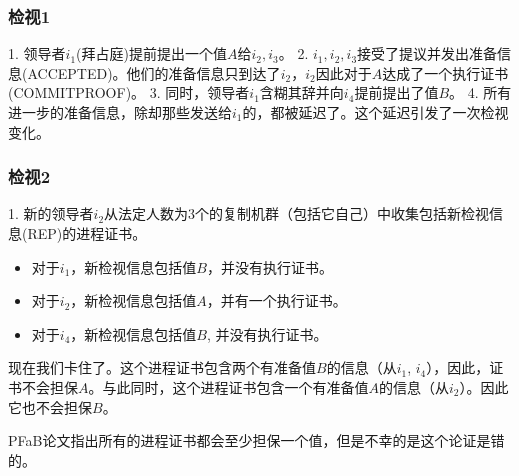 \documentclass[UTF8]{ctexart}
\begin{document}
\subsubsection*{检视1}
1. 领导者$i_1$(拜占庭)提前提出一个值$A$给$i_2, i_3$。
2. $i_1, i_2, i_3$接受了提议并发出准备信息(ACCEPTED)。他们的准备信息只到达了$i_2$，$i_2$因此对于$A$达成了一个执行证书(COMMITPROOF)。
3. 同时，领导者$i_1$含糊其辞并向$i_4$提前提出了值$B$。
4. 所有进一步的准备信息，除却那些发送给$i_1$的，都被延迟了。这个延迟引发了一次检视变化。
\subsubsection*{检视2}
1. 新的领导者$i_2$从法定人数为$3$个的复制机群（包括它自己）中收集包括新检视信息(REP)的进程证书。
\begin{itemize}
	\item 对于$i_1$，新检视信息包括值$B$，并没有执行证书。
	\item 对于$i_2$，新检视信息包括值$A$，并有一个执行证书。
	\item 对于$i_4$，新检视信息包括值$B$, 并没有执行证书。
\end{itemize}
现在我们卡住了。这个进程证书包含两个有准备值$B$的信息（从$i_1$, $i_4$），因此，证书不会担保$A$。与此同时，这个进程证书包含一个有准备值$A$的信息（从$i_2$）。因此它也不会担保$B$。

PFaB论文指出所有的进程证书都会至少担保一个值，但是不幸的是这个论证是错的。
\end{document}
